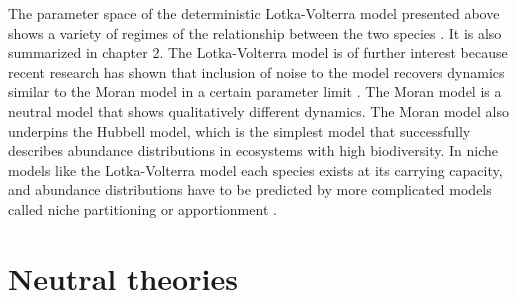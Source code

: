 The parameter space of the deterministic Lotka-Volterra model presented above shows a variety of regimes of the relationship between the two species \cite{Neuhauser1999,there is another I'm sure of it}. 
It is also summarized in chapter 2. %
The Lotka-Volterra model is of further interest because recent research has shown that inclusion of noise to the model recovers dynamics similar to the Moran model in a certain parameter limit \cite{so so many}. 
The Moran model is a neutral model that shows qualitatively different dynamics. 
The Moran model also underpins the Hubbell model, which is the simplest model that successfully describes abundance distributions in ecosystems with high biodiversity. 
In niche models like the Lotka-Volterra model each species exists at its carrying capacity, and abundance distributions have to be predicted by more complicated models called niche partitioning or apportionment \cite{hopefully these are somewhere}. 


\section{Neutral theories}

